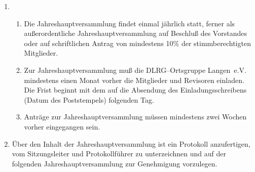 \documentclass[%
12pt, %
a4paper, %
headsepline, %
footsepline, %
parskip, %
headings=normal, %
]{scrartcl}
\begin{document}
\begin{enumerate}
\begin{enumerate}[noitemsep]
      \end{enumerate}
    \item \begin{enumerate}[noitemsep]
        \item Die Jahreshauptversammlung findet einmal jährlich statt, ferner als außerordentliche Jahreshauptversammlung auf Beschluß des Vorstandes oder auf schriftlichen Antrag von mindestens 10\% der stimmberechtigten Mitglieder.
        \item Zur Jahreshauptversammlung muß die DLRG--Ortsgruppe Langen~e.V. mindestens einen Monat vorher die Mitglieder und Revisoren einladen. Die Frist beginnt mit dem auf die Absendung des Einladungsschreibens (Datum des Poststempels) folgenden Tag.
        \item Anträge zur Jahreshauptversammlung müssen mindestens zwei Wochen vorher eingegangen sein.
      \end{enumerate}
    \item Über den Inhalt der Jahreshauptversammlung ist ein Protokoll anzufertigen, vom Sitzungsleiter und Protokollführer zu unterzeichnen und auf der folgenden Jahreshauptversammlung zur Genehmigung vorzulegen.
\end{enumerate}
\end{document}
